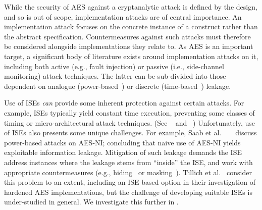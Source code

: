 
While the security of AES against a cryptanalytic attack is defined by
the design, and so is out of scope, implementation attacks are
of central importance.
An implementation attack focuses on the concrete instance of a construct
rather than the abstract specification.
Countermeasures against such attacks must therefore be
considered alongside implementations they relate to.
As AES is an important target, a significant body of literature exists
around implementation attacks on it, including both
 active (e.g., fault injection)
or
passive (i.e., side-channel monitoring)
attack techniques.
The latter can be sub-divided into those dependent on
analogue
(power-based~\cite{ManOswPop:07})
or
discrete 
(time-based~\cite{KoeQui:99})
leakage.

Use of ISEs
{\em can} provide some inherent protection against certain attacks.
For example,
ISEs typically yield constant time execution,
preventing some classes of timing or micro-architectural
attack techniques.
(See ~\cite[Section 4]{Szefer:19} and ~\cite[Section 4]{GYCH:18})
Unfortunately,
use of ISEs also presents some unique challenges.
For example, 
Saab et al. ~ ~\cite{SaaRohHam:16}
discuss power-based attacks on AES-NI; concluding
that naive use of AES-NI yields exploitable information leakage.
Mitigation of such leakage demands the ISE
address instances where the leakage stems from ``inside'' the ISE,
and work with appropriate countermeasures
(e.g., hiding~\cite[Chapter 7]{ManOswPop:07} or masking~\cite[Chapter 10]{ManOswPop:07}).
Tillich et al.~\cite{TilHerMan:07}
consider this problem to an extent, including an ISE-based option in
their investigation of hardened AES implementations, but the challenge
of developing suitable ISEs is under-studied in general.
We investigate this further in .

